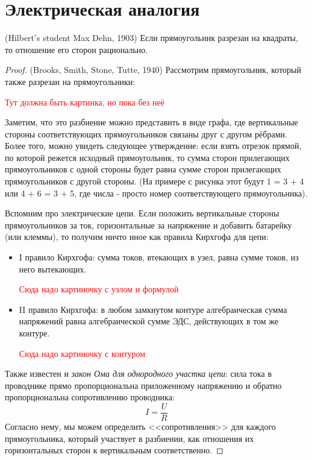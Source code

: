 \section{Электрическая аналогия}

\begin{theorem} (Hilbert's student Max Dehn, 1903)
	Если прямоугольник разрезан на квадраты, то отношение его сторон рационально.
\end{theorem}

\begin{proof} (Brooks, Smith, Stone, Tutte, 1940)
	Рассмотрим прямоугольник, который также разрезан на прямоугольники:
	
	\textcolor{red}{Тут должна быть картинка, но пока без неё}
	
	Заметим, что это разбиение можно представить в виде графа, где вертикальные стороны соответствующих прямоугольников связаны друг с другом рёбрами. Более того, можно увидеть следующее утверждение: если взять отрезок прямой, по которой режется исходный прямоугольник, то сумма сторон прилегающих прямоугольников с одной стороны будет равна сумме сторон прилегающих прямоугольников с другой стороны. (На примере с рисунка этот будут 1 = 3 + 4 или 4 + 6 = 3 + 5, где числа - просто номер соответствующего прямоугольника).
	
	Вспомним про электрические цепи. Если положить вертикальные стороны прямоугольников за ток, горизонтальные за напряжение и добавить батарейку (или клеммы), то получим ничто иное как правила Кирхгофа для цепи:
	\begin{itemize}
		\item I правило Кирхгофа: сумма токов, втекающих в узел, равна сумме токов, из него вытекающих.
		
		\textcolor{red}{Сюда надо картиночку с узлом и формулой}
		
		\item II правило Кирхгофа: в любом замкнутом контуре алгебраическая сумма напряжений равна алгебраической сумме ЭДС, действующих в том же контуре.
		
		\textcolor{red}{Сюда надо картиночку с контуром}
	\end{itemize}
	Также известен и \textit{закон Ома для однородного участка цепи}: сила тока в проводнике прямо пропорциональна приложенному напряжению и обратно пропорциональна сопротивлению проводника:
	\[
		I = \frac{U}{R}
	\]
	Согласно нему, мы можем определить <<сопротивления>> для каждого прямоугольника, который участвует в разбиении, как отношения их горизонтальных сторон к вертикальным соответственно.
	

\end{proof}
